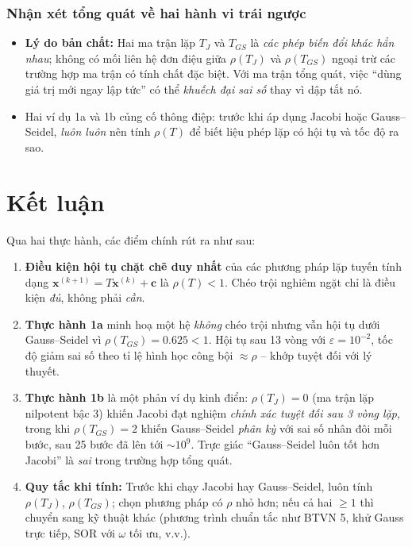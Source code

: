 \documentclass[12pt,a4paper]{article}
\begin{document}
\subsubsection{Nhận xét tổng quát về hai hành vi trái ngược}

\begin{itemize}
    \item \textbf{Lý do bản chất:} Hai ma trận lặp $T_J$ và $T_{GS}$ là \emph{các phép biến đổi khác hẳn nhau}; không có mối liên hệ đơn điệu giữa $\rho(T_J)$ và $\rho(T_{GS})$ ngoại trừ các trường hợp ma trận có tính chất đặc biệt. Với ma trận tổng quát, việc ``dùng giá trị mới ngay lập tức'' có thể \emph{khuếch đại sai số} thay vì dập tắt nó.
    \item Hai ví dụ 1a và 1b củng cố thông điệp: trước khi áp dụng Jacobi hoặc Gauss--Seidel, \emph{luôn luôn} nên tính $\rho(T)$ để biết liệu phép lặp có hội tụ và tốc độ ra sao.
\end{itemize}

\section{Kết luận}

Qua hai thực hành, các điểm chính rút ra như sau:

\begin{enumerate}
    \item \textbf{Điều kiện hội tụ chặt chẽ duy nhất} của các phương pháp lặp tuyến tính dạng $\mathbf{x}^{(k+1)} = T\mathbf{x}^{(k)} + \mathbf{c}$ là $\rho(T) < 1$. Chéo trội nghiêm ngặt chỉ là điều kiện \emph{đủ}, không phải \emph{cần}.

    \item \textbf{Thực hành 1a} minh hoạ một hệ \emph{không} chéo trội nhưng vẫn hội tụ dưới Gauss--Seidel vì $\rho(T_{GS}) = 0.625 < 1$. Hội tụ sau 13 vòng với $\varepsilon = 10^{-2}$, tốc độ giảm sai số theo tỉ lệ hình học công bội $\approx \rho$ -- khớp tuyệt đối với lý thuyết.

    \item \textbf{Thực hành 1b} là một phản ví dụ kinh điển: $\rho(T_J) = 0$ (ma trận lặp nilpotent bậc 3) khiến Jacobi đạt nghiệm \emph{chính xác tuyệt đối sau 3 vòng lặp}, trong khi $\rho(T_{GS}) = 2$ khiến Gauss--Seidel \emph{phân kỳ} với sai số nhân đôi mỗi bước, sau 25 bước đã lên tới $\sim 10^9$. Trực giác ``Gauss--Seidel luôn tốt hơn Jacobi'' là \emph{sai} trong trường hợp tổng quát.

    \item \textbf{Quy tắc khi tính:} Trước khi chạy Jacobi hay Gauss--Seidel, luôn tính $\rho(T_J)$, $\rho(T_{GS})$; chọn phương pháp có $\rho$ nhỏ hơn; nếu cả hai $\ge 1$ thì chuyển sang kỹ thuật khác (phương trình chuẩn tắc như BTVN 5, khử Gauss trực tiếp, SOR với $\omega$ tối ưu, v.v.).

\end{enumerate}
\end{document}
